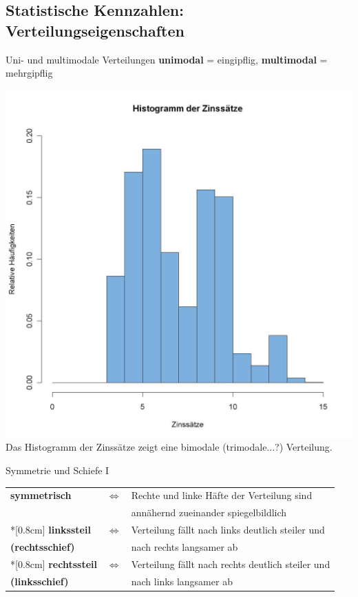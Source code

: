 \documentclass[
  10pt,
  ignorenonframetext,
]{beamer}
\begin{document}
\subsection{Statistische Kennzahlen:
Verteilungseigenschaften}\label{statistische-kennzahlen-verteilungseigenschaften}

\begin{frame}{Uni- und multimodale Verteilungen}
\label{uni--und-multimodale-verteilungen}
\textbf{unimodal} = eingipflig, \textbf{multimodal} = mehrgipflig

\begin{center}
 \includegraphics[width=.5\textwidth]{pics/2-zinssatz3.jpg}\\
  {\small Das Histogramm der Zinssätze zeigt eine
bimodale (trimodale...?) Verteilung.}
\end{center}
\end{frame}

\begin{frame}{Symmetrie und Schiefe I}
\label{symmetrie-und-schiefe-i}
\begin{tabular}{lcl}
  \textbf{symmetrisch} & $\Leftrightarrow$
  & Rechte und linke Häfte der Verteilung sind \\
  && annähernd zueinander spiegelbildlich \\*[0.8cm]
  \textbf{linkssteil } & $\Leftrightarrow$ & Verteilung
fällt nach links deutlich steiler und \\
  \textbf{(rechtsschief)}&& nach rechts langsamer ab\\*[0.8cm]
  \textbf{rechtssteil }& $\Leftrightarrow$   & Verteilung
fällt nach rechts deutlich steiler und \\
 \textbf{(linksschief)}&& nach links langsamer ab
\end{tabular}
\end{frame}
\end{document}
